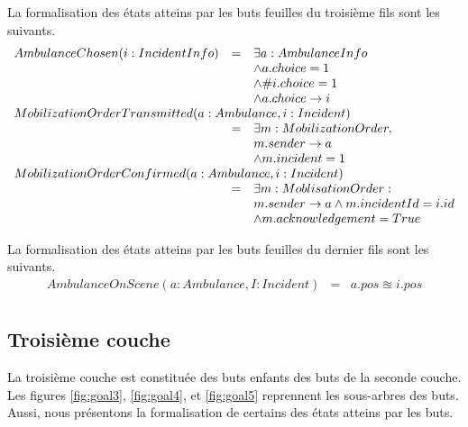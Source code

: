 	La formalisation des états atteins par les buts feuilles du troisième fils sont
	les suivants.
	\singlespacing
	\begin{equation*}
		\begin{array}{rcl}
			AmbulanceChosen(i:IncidentInfo)  
			& = & \exists a:AmbulanceInfo \\
			&   & \wedge a.choice = 1 \\
			&   & \wedge \#i.choice = 1 \\
			&   & \wedge a.choice \rightarrow i \\
			
			\multicolumn{3}{l}{MobilizationOrderTransmitted(a: Ambulance, i:Incident)} \\ 
			& = & \exists m: MobilizationOrder, \\
			&   & m.sender \rightarrow a \\
			&   & \wedge m.incident = 1 \\
			
			\multicolumn{3}{l}{MobilizationOrderConfirmed(a:Ambulance, i:Incident)} \\ 
			& = & \exists m:MoblisationOrder: \\
			&   & m.sender \rightarrow a \wedge m.incidentId = i.id \\ 
			&   & \wedge m.acknowledgement = True \\
		\end{array}
	\end{equation*}
	\onehalfspacing
	
	La formalisation des états atteins par les buts feuilles du dernier fils sont
	les suivants.		
	\singlespacing
	\begin{equation*}
		\begin{array}{rcl}
			AmbulanceOnScene(a:Ambulance, I:Incident)
			& = & a.pos \approxeq i.pos \\ 
		\end{array}
	\end{equation*}
	\onehalfspacing


\subsection{Troisième couche}

	La troisième couche est constituée des buts enfants
	des buts de la seconde couche. Les figures \ref{fig:goal3}, \ref{fig:goal4},
	et \ref{fig:goal5} reprennent les sous-arbres des buts. Aussi, nous
	présentons la formalisation de certains des états atteins par les
	buts.

